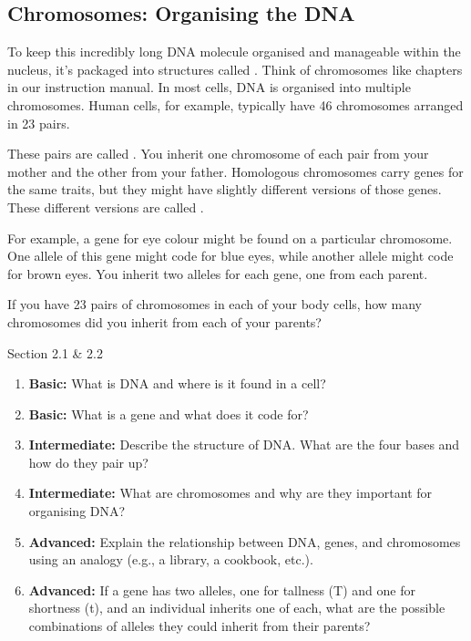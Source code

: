 \subsection{Chromosomes: Organising the DNA}

To keep this incredibly long DNA molecule organised and manageable within the nucleus, it's packaged into structures called . Think of chromosomes like chapters in our instruction manual.  In most cells, DNA is organised into multiple chromosomes.  Human cells, for example, typically have 46 chromosomes arranged in 23 pairs.

These pairs are called . You inherit one chromosome of each pair from your mother and the other from your father. Homologous chromosomes carry genes for the same traits, but they might have slightly different versions of those genes. These different versions are called .

For example, a gene for eye colour might be found on a particular chromosome.  One allele of this gene might code for blue eyes, while another allele might code for brown eyes.  You inherit two alleles for each gene, one from each parent.

\begin{marginnote}
\end{marginnote}

\begin{stopandthink}
If you have 23 pairs of chromosomes in each of your body cells, how many chromosomes did you inherit from each of your parents?
\end{stopandthink}

\begin{tieredquestions}{Section 2.1 & 2.2}

\begin{enumerate}
    \item \textbf{Basic:} What is DNA and where is it found in a cell?
    \item \textbf{Basic:} What is a gene and what does it code for?
    \item \textbf{Intermediate:} Describe the structure of DNA. What are the four bases and how do they pair up?
    \item \textbf{Intermediate:} What are chromosomes and why are they important for organising DNA?
    \item \textbf{Advanced:} Explain the relationship between DNA, genes, and chromosomes using an analogy (e.g., a library, a cookbook, etc.).
    \item \textbf{Advanced:}  If a gene has two alleles, one for tallness (T) and one for shortness (t), and an individual inherits one of each, what are the possible combinations of alleles they could inherit from their parents?
\end{enumerate}

\end{tieredquestions}


